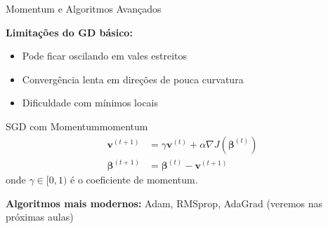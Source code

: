 \documentclass[xcolor=dvipsnames,t,aspectratio=169]{beamer} %
\newcommand{\highlight}[1]{{\color{nes_dark_orange} #1}}
\begin{document}
\begin{frame}[c]{Momentum e Algoritmos Avançados}
    
    \textbf{Limitações do GD básico:}
    \begin{itemize}
        \item Pode ficar \highlight{oscilando} em vales estreitos
        \item Convergência \highlight{lenta} em direções de pouca curvatura
        \item Dificuldade com \highlight{mínimos locais}
    \end{itemize}
    
    \vspace{0.5cm}
    
    \begin{defi}{SGD com Momentum}{momentum}
        \begin{align}
            \mathbf{v}^{(t+1)} &= \gamma \mathbf{v}^{(t)} + \alpha \nabla J(\boldsymbol{\beta}^{(t)}) \\
            \boldsymbol{\beta}^{(t+1)} &= \boldsymbol{\beta}^{(t)} - \mathbf{v}^{(t+1)}
        \end{align}
        onde $\gamma \in [0,1)$ é o coeficiente de momentum.
    \end{defi}
    
    \textbf{Algoritmos mais modernos:} Adam, RMSprop, AdaGrad (veremos nas próximas aulas)
\end{frame}
\end{document}
